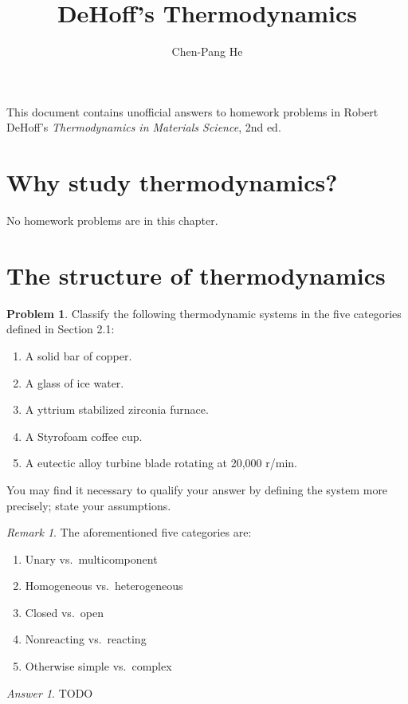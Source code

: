 \documentclass[a4paper, 12pt]{article}
\title{DeHoff's Thermodynamics}
\author{Chen-Pang He}
\theoremstyle{definition}
\newtheorem{problem}{Problem}[section]
\theoremstyle{remark}
\newtheorem*{remark}{Remark}
\newtheorem*{answer}{Answer}
\renewcommand{\theenumi}{\alph{enumi}}
\begin{document}
\maketitle
This document contains unofficial answers to homework problems in Robert
DeHoff's \textit{Thermodynamics in Materials Science}, 2nd ed.

\section{Why study thermodynamics?}
No homework problems are in this chapter.

\section{The structure of thermodynamics}
\begin{problem}
    Classify the following thermodynamic systems in the five categories defined
    in Section 2.1:
    \begin{enumerate}
        \item A solid bar of copper.
        \item A glass of ice water.
        \item A yttrium stabilized zirconia furnace.
        \item A Styrofoam coffee cup.
        \item A eutectic alloy turbine blade rotating at 20,000 r/min.
    \end{enumerate}

    You may find it necessary to qualify your answer by defining the system
    more precisely; state your assumptions.

    \begin{remark}
        \renewcommand{\theenumi}{\arabic{enumi}}
        The aforementioned five categories are:
        \begin{enumerate}
            \item Unary vs.\ multicomponent
            \item Homogeneous vs.\ heterogeneous
            \item Closed vs.\ open
            \item Nonreacting vs.\ reacting
            \item Otherwise simple vs.\ complex
        \end{enumerate}
    \end{remark}

    \begin{answer}
        TODO
    \end{answer}
\end{problem}
\end{document}
